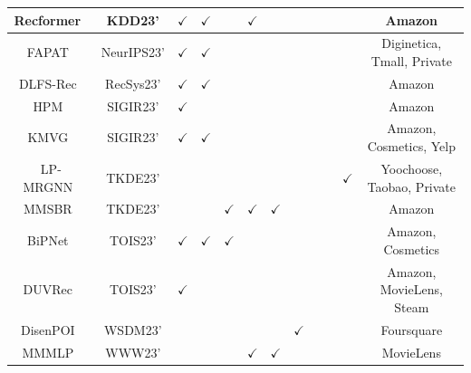 \documentclass[lettersize,journal]{IEEEtran}
\begin{document}
\begin{table}[!th]
\begin{tabular}{c|c|c|c|    c|c|c|c|    c|c|c|c}
 {Recformer~\cite{Li@KDD2023}}    & {KDD23'}    &{$\checkmark$}    & {$\checkmark$}   & {}   & {$\checkmark$}  & {}   & {}  & {}  & {}  & {}    & {Amazon} \\
 \hline
 {FAPAT~\cite{Liu@NeurIPS2023}}    & {NeurIPS23'}    &{$\checkmark$}    & {$\checkmark$}   & {}   & {}  & {}   & {}  & {}    & {}  & {}    & {Diginetica, Tmall, Private} \\  
 \hline
  {DLFS-Rec~\cite{Liu@RecSys2023}}    & {RecSys23'}    &{$\checkmark$}    & {$\checkmark$}   & {}   & {}  & {}   & {}  & {}  & {}  & {}    & {Amazon} \\
 \hline
 {HPM~\cite{Huang@SIGIR2023}}    & {SIGIR23'}    &{$\checkmark$}    & {}   & {}   & {}  & {}   & {}  & {}  & {}  & {}    & {Amazon} \\  
 \hline
 {KMVG~\cite{Chen@SIGIR2023}}    & {SIGIR23'}    &{$\checkmark$}    & {$\checkmark$}   & {}   & {}  & {}  & {}   & {}  & {}  & {}    & {Amazon, Cosmetics, Yelp} \\
 \hline
 {LP-MRGNN~\cite{WW@TKDE2023}}    & {TKDE23'}    &{}    & {}   & {}   & {}  & {}   & {}  & {}  & {}  & {$\checkmark$}    & {Yoochoose, Taobao, Private} \\  
 \hline
 {MMSBR~\cite{MMSBR}}    & {TKDE23'}    &{}    & {}   & {$\checkmark$}   & {$\checkmark$}  & {$\checkmark$}   & {}  & {}  & {}  & {}    & {Amazon} \\
 \hline
 {BiPNet~\cite{BiPNet}}    & {TOIS23'}    &{$\checkmark$}    & {$\checkmark$}   & {$\checkmark$}   & {}  & {}  & {}   & {}  & {}  & {}    & {Amazon, Cosmetics} \\
\hline 
{DUVRec~\cite{Xue@TOIS2023}}    & {TOIS23'}    &{$\checkmark$}    & {}   & {}   & {}  & {}  & {}   & {}  & {}  & {}    & {Amazon, MovieLens, Steam} \\
\hline 
  
 {DisenPOI~\cite{Qin@WSDM2023}}    & {WSDM23'}    &{}    & {}   & {}   & {}  & {}   & {$\checkmark$}  & {}  & {}  & {}    & {Foursquare} \\
 \hline
 {MMMLP~\cite{MMMLP}}    & {WWW23'}    &{}    & {}   & {}   & {$\checkmark$}  & {$\checkmark$}   & {}  & {}  & {}  & {}    & {MovieLens} \\  
 \hline
 
  

\end{tabular}
\end{table}
\end{document}
